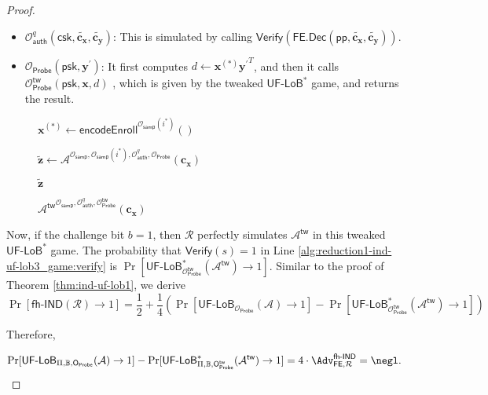 \begin{proof}
\begin{itemize}
	\item $\mathcal{O}_{\textsf{auth}}^q (\textsf{csk}, \mathbf{\tilde{c_x}}, \mathbf{\tilde{c_y}})$: This is simulated by calling $\textsf{Verify}( \textsf{FE.Dec}(\textsf{pp}, \mathbf{\tilde{c_x}}, \mathbf{\tilde{c_y}}) )$.

	\item $\mathcal{O}_{\textsf{Probe}}( \textsf{psk}, \mathbf{y}^\prime )$: It first computes $d \gets \mathbf{x}^{(*)}{\mathbf{y}^\prime}^T$, and then it calls $\mathcal{O}_{\textsf{Probe}}^\textsf{tw} (\textsf{psk}, \mathbf{x}, d)$ , which is given by the tweaked $\textsf{UF-LoB}^*$ game, and returns the result.

\end{itemize}

\begin{figure}[h]
\centering
	
	\begin{minipage}[t]{0.5\linewidth}
	\centering
	\begin{algorithm}[H]
	\caption{${\mathcal{A}^\textsf{tw}}^{\mathcal{O}_\textsf{samp}, \mathcal{O}_\textsf{auth}^q, \mathcal{O}_{\textsf{Probe}}^\textsf{tw} } ( \mathbf{c_x}) $}
	\label{alg:adv-tw-ind-uf-lob3_game}
	\begin{algorithmic}[1]
		\State $\mathbf{x}^{(*)} \gets \textsf{encodeEnroll}^{ \mathcal{O}_\textsf{samp}(i^*)} ()$ 

		\State ${\mathbf{\tilde{z}}} \gets \mathcal{A}^{\mathcal{O}_{\textsf{samp}}, \mathcal{O}_{\textsf{samp}}(i^*), \mathcal{O}_\textsf{auth}^q, \mathcal{O}_{\textsf{Probe}} } ( \mathbf{c_x})$

		\State \Return ${\mathbf{\tilde{z}}}$
	\end{algorithmic}
	\end{algorithm}
	\end{minipage}
	
\label{fig:adv-tw-ind-uf-lob3_game}
\end{figure}

Now, if the challenge bit $b = 1$, then $\mathcal{R}$ perfectly simulates $\mathcal{A}^\textsf{tw}$ in this tweaked $\textsf{UF-LoB}^*$ game. 
The probability that $\textsf{Verify}(s) = 1$ in Line \ref{alg:reduction1-ind-uf-lob3_game:verify} is $\Pr[ \textsf{UF-LoB}_{\mathcal{O}_\textsf{Probe}^\textsf{tw}}^*(\mathcal{A}^\textsf{tw}) \to 1 ]$.
Similar to the proof of Theorem \ref{thm:ind-uf-lob1}, we derive
\[
	\Pr[\textsf{fh-IND}(\mathcal{R}) \to 1]
	= \frac{1}{2} + \frac{1}{4} \left( \Pr[\textsf{UF-LoB}_{\mathcal{O}_\textsf{Probe}}(\mathcal{A}) \to 1] - \Pr[ \textsf{UF-LoB}_{\mathcal{O}_\textsf{Probe}^\textsf{tw}}^*(\mathcal{A}^\textsf{tw}) \to 1 ] \right)
\]

Therefore,

\[
	\Pr[\textsf{UF-LoB}_{\Pi, \mathbb{B}, \textsf{O}_{\textsf{Probe}}}(\mathcal{A}) \to 1] - \Pr[\textsf{UF-LoB}^*_{\Pi, \mathbb{B}, \textsf{O}_{\textsf{Probe}}^\textsf{tw} }(\mathcal{A}^\textsf{tw} ) \to 1] = 4 \cdot \Adv_{\textsf{FE}, \mathcal{R}}^\textsf{fh-IND} = \negl.
\]	


\end{proof}
